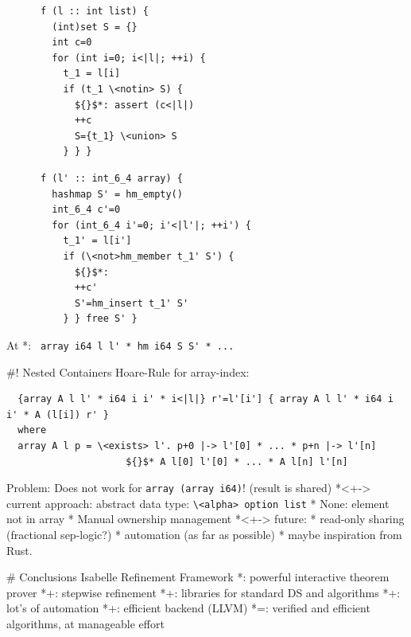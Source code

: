 \documentclass[fleqn]{beamer}
\newcommand{\isai}{\lstinline[language=isabelle,basicstyle=\normalsize\ttfamily\slshape]}
\begin{document}
    \begin{minipage}{.48\textwidth}
    \onslide<+->
    \begin{lstlisting}
      f (l :: int list) {
        (int)set S = {}
        int c=0
        for (int i=0; i<|l|; ++i) {
          t_1 = l[i]
          if (t_1 \<notin> S) {
            ${}$*: assert (c<|l|)
            ++c
            S={t_1} \<union> S
          } } }
    \end{lstlisting}
    \end{minipage}%
    \begin{minipage}{.48\textwidth}
    \onslide<+->
    \begin{lstlisting}
      f (l' :: int_6_4 array) {
        hashmap S' = hm_empty()
        int_6_4 c'=0
        for (int_6_4 i'=0; i'<|l'|; ++i') {
          t_1' = l[i']
          if (\<not>hm_member t_1' S') {
            ${}$*:
            ++c'
            S'=hm_insert t_1' S'
          } } free S' }
    \end{lstlisting}
    \end{minipage}
  \onslide<+->At *: \isai{ array i64 l l' * hm i64 S S' * ... }

#! Nested Containers
  \onslide<+->
  Hoare-Rule for array-index:
  \begin{lstlisting}
  {array A l l' * i64 i i' * i<|l|} r'=l'[i'] { array A l l' * i64 i i' * A (l[i]) r' }
  where
  array A l p = \<exists> l'. p+0 |-> l'[0] * ... * p+n |-> l'[n]
                     ${}$* A l[0] l'[0] * ... * A l[n] l'[n]
  \end{lstlisting}

  \onslide<+->
  Problem: Does not work for \isai{array (array i64)}! (result is shared)
  *<+-> current approach: abstract data type: \isai$\<alpha> option list$
    * None: element not in array
    * Manual ownership management
  *<+-> future:
    * read-only sharing (fractional sep-logic?)
    * automation (as far as possible)
    * maybe inspiration from Rust.


%


# Conclusions
  Isabelle Refinement Framework
    *{}: powerful interactive theorem prover
    *+: stepwise refinement
    *+: libraries for standard DS and algorithms
    *+: lot's of automation
    *+: efficient backend (LLVM)
    *=: verified and efficient algorithms, at manageable effort
\end{document}
